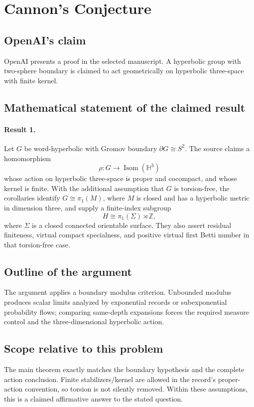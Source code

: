 \documentclass[11pt]{article}
\begin{document}
\section*{Cannon's Conjecture}

\subsection{OpenAI's claim}
OpenAI presents a proof in the selected manuscript. A hyperbolic group with two-sphere boundary is claimed to act geometrically on hyperbolic three-space with finite kernel.

\subsection{Mathematical statement of the claimed result}
\paragraph{Result 1.} Let \(G\) be word-hyperbolic with Gromov boundary \(\partial G\cong S^2\). The source claims a homomorphism
\[
 \rho:G\longrightarrow\operatorname{Isom}(\mathbb H^3)
\]
whose action on hyperbolic three-space is proper and cocompact, and whose kernel is finite. With the additional assumption that \(G\) is torsion-free, the corollaries identify \(G\cong\pi_1(M)\), where \(M\) is closed and has a hyperbolic metric in dimension three, and supply a finite-index subgroup
\[
 H\cong\pi_1(\Sigma)\rtimes\mathbb Z,
\]
where \(\Sigma\) is a closed connected orientable surface. They also assert residual finiteness, virtual compact specialness, and positive virtual first Betti number in that torsion-free case.

\subsection{Outline of the argument}
The argument applies a boundary modulus criterion. Unbounded modulus produces scalar limits analyzed by exponential records or subexponential probability flows; comparing same-depth expansions forces the required measure control and the three-dimensional hyperbolic action.

\subsection{Scope relative to this problem}
The main theorem exactly matches the boundary hypothesis and the complete action conclusion. Finite stabilizers/kernel are allowed in the record’s proper-action convention, so torsion is not silently removed. Within these assumptions, this is a claimed affirmative answer to the stated question.
\end{document}

